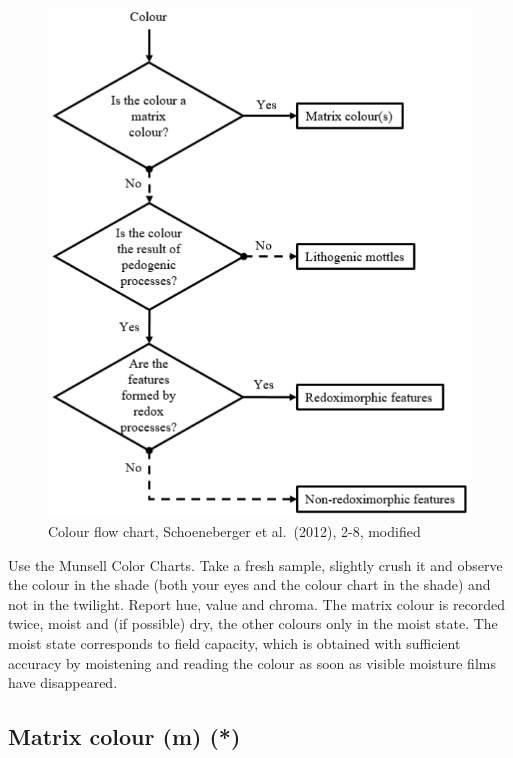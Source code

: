 \documentclass[
  letterpaper,
  DIV=11,
  numbers=noendperiod]{scrreprt}
\begin{document}
\begin{figure}

{\centering \includegraphics{./figure_8-18.png}

}

\caption{Colour flow chart, Schoeneberger et al.~(2012), 2-8, modified}

\end{figure}

Use the Munsell Color Charts. Take a fresh sample, slightly crush it and
observe the colour in the shade (both your eyes and the colour chart in
the shade) and not in the twilight. Report hue, value and chroma. The
matrix colour is recorded twice, moist and (if possible) dry, the other
colours only in the moist state. The moist state corresponds to field
capacity, which is obtained with sufficient accuracy by moistening and
reading the colour as soon as visible moisture films have disappeared.

\hypertarget{matrix-colour-m}{%
\subsection{Matrix colour (m) (*)}\label{matrix-colour-m}}
\end{document}
